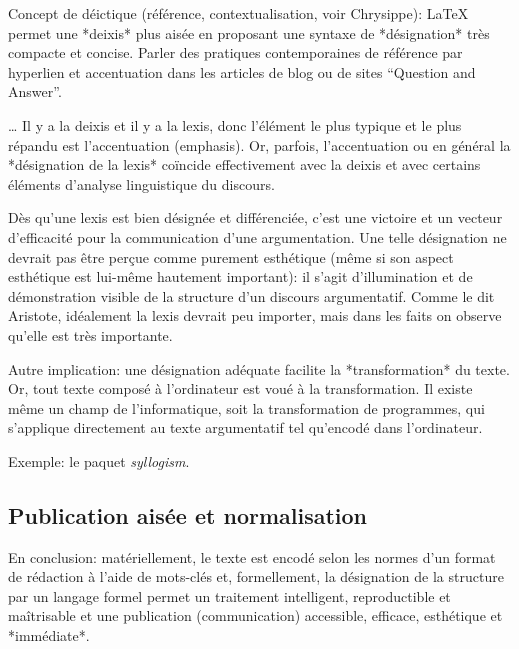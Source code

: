 \documentclass{article}
\newcommand\pkgname[1]{\emph{#1}}
\begin{document}
Concept de déictique (référence, contextualisation, voir Chrysippe): LaTeX permet une *deixis* plus aisée en proposant une syntaxe de *désignation* très compacte et concise. Parler des pratiques contemporaines de référence par hyperlien et accentuation dans les articles de blog ou de sites “Question and Answer”.

… Il y a la deixis et il y a la lexis, donc l’élément le plus typique et le plus répandu est l’accentuation (emphasis). Or, parfois, l’accentuation ou en général la *désignation de la lexis* coïncide effectivement avec la deixis et avec certains éléments d’analyse linguistique du discours.

Dès qu’une lexis est bien désignée et différenciée, c’est une victoire et un vecteur d’efficacité pour la communication d’une argumentation. Une telle désignation ne devrait pas être perçue comme purement esthétique (même si son aspect esthétique est lui-même hautement important): il s’agit d’illumination et de démonstration visible de la structure d’un discours argumentatif. Comme le dit Aristote, idéalement la lexis devrait peu importer, mais dans les faits on observe qu’elle est très importante.

Autre implication: une désignation adéquate facilite la *transformation* du texte. Or, tout texte composé à l’ordinateur est voué à la transformation. Il existe même un champ de l’informatique, soit la transformation de programmes, qui s’applique directement au texte argumentatif tel qu’encodé dans l’ordinateur.

Exemple: le paquet \pkgname{syllogism}.

\subsection{Publication aisée et normalisation}

En conclusion: matériellement, le texte est encodé selon les normes d’un format de rédaction à l’aide de mots-clés et, formellement, la désignation de la structure par un langage formel permet un traitement intelligent, reproductible et maîtrisable et une publication (communication) accessible, efficace, esthétique et *immédiate*.
\end{document}
